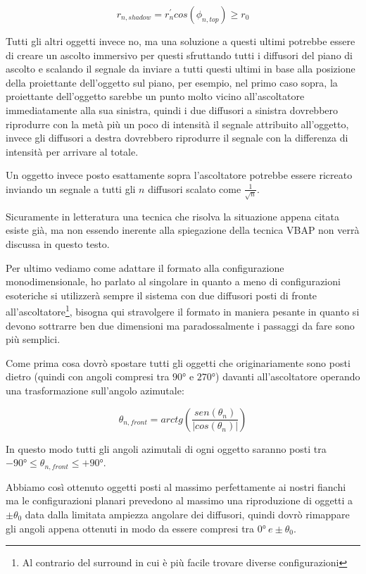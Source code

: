 \documentclass[12pt,a4paper]{report}
\begin{document}
\begin{equation}
r_{n,shadow}=r_n^{\prime} cos(\phi_{n,top}) \geq r_0
\label{zzz}
\end{equation}

Tutti gli altri oggetti invece no, ma una soluzione a questi ultimi potrebbe essere di creare un ascolto immersivo per questi sfruttando tutti i diffusori del piano di ascolto e scalando il segnale da inviare a tutti questi ultimi in base alla posizione della proiettante dell'oggetto sul piano, per esempio, nel primo caso sopra, la proiettante dell'oggetto sarebbe un punto molto vicino all'ascoltatore immediatamente alla sua sinistra, quindi i due diffusori a sinistra dovrebbero riprodurre con la metà più un poco di intensità il segnale attribuito all'oggetto, invece gli diffusori a destra dovrebbero riprodurre il segnale con la differenza di intensità per arrivare al totale.

Un oggetto invece posto esattamente sopra l'ascoltatore potrebbe essere ricreato inviando un segnale a tutti gli $n$ diffusori scalato come $\frac{1}{\sqrt{n}}$.

Sicuramente in letteratura una tecnica che risolva la situazione appena citata esiste già, ma non essendo inerente alla spiegazione della tecnica VBAP non verrà discussa in questo testo.


Per ultimo vediamo come adattare il formato alla configurazione monodimensionale, ho parlato al singolare in quanto a meno di configurazioni esoteriche si utilizzerà sempre il sistema con due diffusori posti di fronte all'ascoltatore\footnote{Al contrario del surround in cui è più facile trovare diverse configurazioni}, bisogna qui stravolgere il formato in maniera pesante in quanto si devono sottrarre ben due dimensioni ma paradossalmente i passaggi da fare sono più semplici.

Come prima cosa dovrò spostare tutti gli oggetti che originariamente sono posti dietro (quindi con angoli compresi tra $90°$ e $270°$) davanti all'ascoltatore operando una trasformazione sull'angolo azimutale:

\begin{equation}
\theta_{n,front} = arctg  \left( \dfrac{sen(\theta_n)}{\vert cos(\theta_n)\vert } \right)
\label{llll}
\end{equation}

In questo modo tutti gli angoli azimutali di ogni oggetto saranno posti tra $-90° \leq \theta_{n,front} \leq +90°$.

Abbiamo così ottenuto oggetti posti al massimo perfettamente ai nostri fianchi ma le configurazioni planari prevedono al massimo una riproduzione di oggetti a $\pm \theta_0$ data dalla limitata ampiezza angolare dei diffusori, quindi dovrò rimappare gli angoli appena ottenuti in modo da essere compresi tra $0°\ e \pm \theta_0$.
\end{document}

